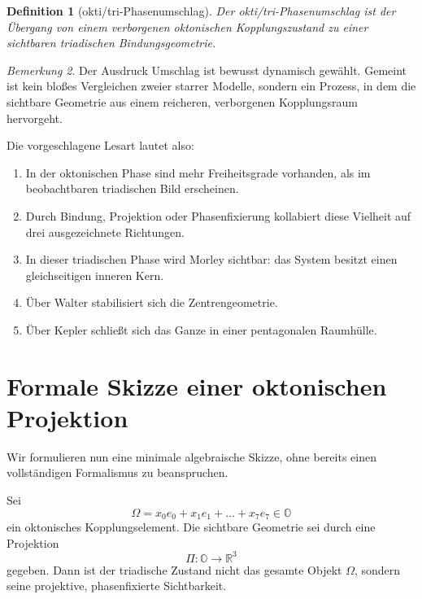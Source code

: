 \documentclass[11pt,a4paper]{article}
\newtheorem{definition}{Definition}[section]
\theoremstyle{remark}
\newtheorem{bemerkung}[definition]{Bemerkung}
\newcommand{\R}{\mathbb{R}}
\newcommand{\OO}{\mathbb{O}}
\begin{document}
	\begin{definition}[okti/tri-Phasenumschlag]
		Der \emph{okti/tri-Phasenumschlag} ist der Übergang von einem verborgenen oktonischen Kopplungszustand zu einer sichtbaren triadischen Bindungsgeometrie.
	\end{definition}
	
	\begin{bemerkung}
		Der Ausdruck \glqq Umschlag\grqq{} ist bewusst dynamisch gewählt. Gemeint ist kein bloßes Vergleichen zweier starrer Modelle, sondern ein Prozess, in dem die sichtbare Geometrie aus einem reicheren, verborgenen Kopplungsraum hervorgeht.
	\end{bemerkung}
	
	Die vorgeschlagene Lesart lautet also:
	\begin{enumerate}[label=(\roman*)]
		\item In der oktonischen Phase sind mehr Freiheitsgrade vorhanden, als im beobachtbaren triadischen Bild erscheinen.
		\item Durch Bindung, Projektion oder Phasenfixierung kollabiert diese Vielheit auf drei ausgezeichnete Richtungen.
		\item In dieser triadischen Phase wird Morley sichtbar: das System besitzt einen gleichseitigen inneren Kern.
		\item Über Walter stabilisiert sich die Zentrengeometrie.
		\item Über Kepler schließt sich das Ganze in einer pentagonalen Raumhülle.
	\end{enumerate}
	
	\section{Formale Skizze einer oktonischen Projektion}
	
	Wir formulieren nun eine minimale algebraische Skizze, ohne bereits einen vollständigen Formalismus zu beanspruchen.
	
	Sei
	\begin{equation}
		\Omega = x_0 e_0 + x_1 e_1 + \dots + x_7 e_7 \in \OO
	\end{equation}
	ein oktonisches Kopplungselement. Die sichtbare Geometrie sei durch eine Projektion
	\begin{equation}
		\Pi: \OO \to \R^3
	\end{equation}
	gegeben. Dann ist der triadische Zustand nicht das gesamte Objekt $\Omega$, sondern seine projektive, phasenfixierte Sichtbarkeit.
	
\end{document}
